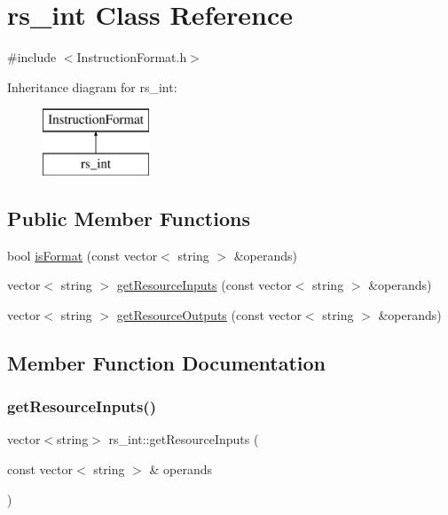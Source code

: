\hypertarget{classrs__int}{}\section{rs\+\_\+int Class Reference}
\label{classrs__int}


{\ttfamily \#include $<$Instruction\+Format.\+h$>$}

Inheritance diagram for rs\+\_\+int\+:\begin{figure}[H]
\begin{center}
\leavevmode
\includegraphics[height=2.000000cm]{classrs__int}
\end{center}
\end{figure}
\subsection*{Public Member Functions}
\begin{DoxyCompactItemize}
\item 
bool \hyperlink{classrs__int_ad8660fae74d3763a5068b22a79ffdd92}{is\+Format} (const vector$<$ string $>$ \&operands)
\item 
vector$<$ string $>$ \hyperlink{classrs__int_a75c4c434457fcf4a2058993acf97298f}{get\+Resource\+Inputs} (const vector$<$ string $>$ \&operands)
\item 
vector$<$ string $>$ \hyperlink{classrs__int_a8c83bc7081f9ff48657aaf5d7fbbaf1d}{get\+Resource\+Outputs} (const vector$<$ string $>$ \&operands)
\end{DoxyCompactItemize}


\subsection{Member Function Documentation}
\mbox{\label{classrs__int_a75c4c434457fcf4a2058993acf97298f}} 
\subsubsection{\texorpdfstring{get\+Resource\+Inputs()}{getResourceInputs()}}
{\footnotesize\ttfamily vector$<$string$>$ rs\+\_\+int\+::get\+Resource\+Inputs (\begin{DoxyParamCaption}\item[{const vector$<$ string $>$ \&}]{operands }\end{DoxyParamCaption})\hspace{0.3cm}{\ttfamily [virtual]}}


